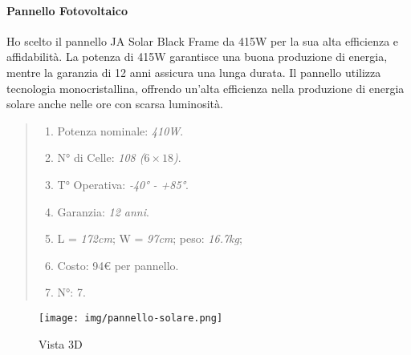 \documentclass[italian, 12pt, a4paper]{article}
\begin{document}
\paragraph{Pannello Fotovoltaico}
Ho scelto il pannello JA Solar Black Frame da 415W per la sua alta efficienza e affidabilità. La potenza di 415W garantisce una buona produzione di energia, mentre la garanzia di 12 anni assicura una lunga durata. Il pannello utilizza tecnologia monocristallina, offrendo un'alta efficienza nella produzione di energia solare anche nelle ore con scarsa luminosità.
\begin{quote}
    \begin{enumerate}
        \item Potenza nominale: \emph{410W}.
        \item N° di Celle: \emph{108 ($6\times 18$)}.
        \item T° Operativa: \emph{-40° - +85°}.
        \item Garanzia: \emph{12 anni}.
        \item L = \emph{172cm}; W = \emph{97cm}; peso: \emph{16.7kg};
        \item Costo: 94€ per pannello.
        \item N°: 7.
    \end{enumerate}
\end{quote}

\begin{figure}[h]
    \centering
    \texttt{[image: img/pannello-solare.png]}
    \caption{Vista 3D}\label{fig:pannello-solare}
\end{figure}
\clearpage
\end{document}
